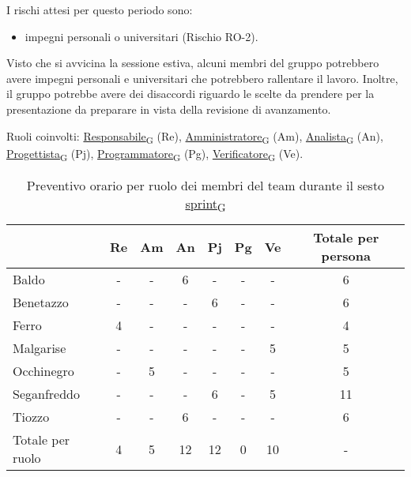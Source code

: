 I rischi attesi per questo periodo sono:
\begin{itemize}
	\item impegni personali o universitari (Rischio RO-2).
\end{itemize}
Visto che si avvicina la sessione estiva, alcuni membri del gruppo potrebbero avere impegni personali e universitari che
potrebbero rallentare il lavoro.
Inoltre, il gruppo potrebbe avere dei disaccordi riguardo le scelte da prendere per la  presentazione da preparare in
vista della revisione di avanzamento.

\newpage
{}
Ruoli coinvolti: \href{https://7last.github.io/docs/rtb/documentazione-interna/glossario\#responsabile}{Responsabile\textsubscript{G}} (Re), \href{https://7last.github.io/docs/rtb/documentazione-interna/glossario\#amministratore}{Amministratore\textsubscript{G}} (Am), \href{https://7last.github.io/docs/rtb/documentazione-interna/glossario\#analista}{Analista\textsubscript{G}} (An), \href{https://7last.github.io/docs/rtb/documentazione-interna/glossario\#progettista}{Progettista\textsubscript{G}} (Pj), \href{https://7last.github.io/docs/rtb/documentazione-interna/glossario\#programmatore}{Programmatore\textsubscript{G}} (Pg), \href{https://7last.github.io/docs/rtb/documentazione-interna/glossario\#verificatore}{Verificatore\textsubscript{G}} (Ve).
\begin{table}[!h]
	\centering
	\begin{tabular}{ | l | c | c | c | c | c | c | c | }
		\hline
		\textbf{} & \textbf{Re} & \textbf{Am} &\textbf{An} & \textbf{Pj} & \textbf{Pg} & \textbf{Ve} & \textbf{Totale per persona} \\
		\hline
		Baldo            &  -   &  -   &  6   &  -   &  -   &  -   &  6   \\
		Benetazzo        &  -   &  -   &  -   &  6   &  -   &  -   &  6   \\
		Ferro            &  4   &  -   &  -   &  -   &  -   &  -   &  4   \\
		Malgarise        &  -   &  -   &  -   &  -   &  -   &  5   &  5   \\
		Occhinegro       &  -   &  5   &  -   &  -   &  -   &  -   &  5   \\
		Seganfreddo      &  -   &  -   &  -   &  6   &  -   &  5   &  11   \\
		Tiozzo           &  -   &  -   &  6   &  -   &  -   &  -   &  6   \\
		\hline
		Totale per ruolo &  4   &  5   &  12   &  12   &  0   &  10   &  -   \\
		\hline
	\end{tabular}
	\caption{Preventivo orario per ruolo dei membri del team durante il sesto \href{https://7last.github.io/docs/rtb/documentazione-interna/glossario\#sprint}{sprint\textsubscript{G}}}

\end{table}

